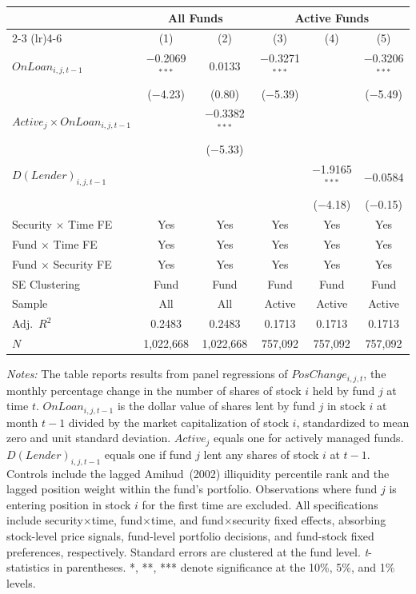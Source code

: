 {\small
\begin{tabular}{l*{5}{c}}
\toprule
 & \multicolumn{2}{c}{All Funds} & \multicolumn{3}{c}{Active Funds} \\
\cmidrule(lr){2-3} \cmidrule(lr){4-6}
 & (1) & (2) & (3) & (4) & (5) \\
\midrule
$\mathit{OnLoan}_{i,j,t-1}$ & $-$0.2069$^{***}$ & 0.0133 & $-$0.3271$^{***}$ & & $-$0.3206$^{***}$ \\
 & ($-$4.23) & (0.80) & ($-$5.39) & & ($-$5.49) \\[0.3em]
$\mathit{Active}_{j} \times \mathit{OnLoan}_{i,j,t-1}$ & & $-$0.3382$^{***}$ & & & \\
 & & ($-$5.33) & & & \\[0.3em]
$D(\mathit{Lender})_{i,j,t-1}$ & & & & $-$1.9165$^{***}$ & $-$0.0584 \\
 & & & & ($-$4.18) & ($-$0.15) \\
\midrule
Security $\times$ Time FE & Yes & Yes & Yes & Yes & Yes \\
Fund $\times$ Time FE & Yes & Yes & Yes & Yes & Yes \\
Fund $\times$ Security FE & Yes & Yes & Yes & Yes & Yes \\
SE Clustering & Fund & Fund & Fund & Fund & Fund \\
\midrule
Sample & All & All & Active & Active & Active \\
Adj.\ $R^2$ & 0.2483 & 0.2483 & 0.1713 & 0.1713 & 0.1713 \\
$N$ & 1,022,668 & 1,022,668 & 757,092 & 757,092 & 757,092 \\
\bottomrule
\end{tabular}
}
\par\smallskip
{\footnotesize
\textit{Notes:} The table reports results from panel regressions of $PosChange_{i,j,t}$, the monthly percentage change in the number of shares of stock $i$ held by fund $j$ at time $t$. $\mathit{OnLoan}_{i,j,t-1}$ is the dollar value of shares lent by fund $j$ in stock $i$ at month $t-1$ divided by the market capitalization of stock $i$, standardized to mean zero and unit standard deviation. $\mathit{Active}_j$ equals one for actively managed funds. $D(\mathit{Lender})_{i,j,t-1}$ equals one if fund $j$ lent any shares of stock $i$ at $t-1$. Controls include the lagged Amihud~(2002) illiquidity percentile rank and the lagged position weight within the fund's portfolio. Observations where fund $j$ is entering position in stock $i$ for the first time are excluded. All specifications include security$\times$time, fund$\times$time, and fund$\times$security fixed effects, absorbing stock-level price signals, fund-level portfolio decisions, and fund-stock fixed preferences, respectively. Standard errors are clustered at the fund level. \textit{t}-statistics in parentheses. *, **, *** denote significance at the 10\%, 5\%, and 1\% levels.
}
